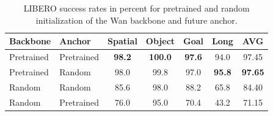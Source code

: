 \begin{table}[htbp]
\vspace{-2mm}
\caption{LIBERO success rates in percent for pretrained and random initialization of the Wan backbone and future anchor.}
\vspace{2mm}
\label{tab:factorialfull}
\centering
\small\setlength{\tabcolsep}{5pt}
\begin{tabular}{@{}llccccc@{}}
\toprule
Backbone & Anchor & Spatial & Object & Goal & Long & AVG \\
\midrule
Pretrained & Pretrained & \textbf{98.2} & \textbf{100.0} & \textbf{97.6} & 94.0 & 97.45 \\
Pretrained & Random & 98.0 & 99.8 & 97.0 & \textbf{95.8} & \textbf{97.65} \\
Random & Random & 85.6 & 98.0 & 88.2 & 65.8 & 84.40 \\
Random & Pretrained & 76.0 & 95.0 & 70.4 & 43.2 & 71.15 \\
\bottomrule
\end{tabular}
\vspace{-2mm}
\end{table}
